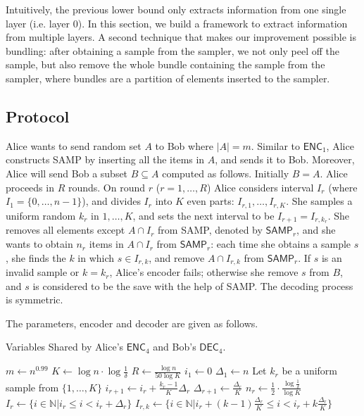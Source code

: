 \documentclass[10pt]{article}
\newcommand{\samp}{\textsf{SAMP}\xspace}
\newcommand{\enc}{\textsf{ENC}\xspace}
\newcommand{\dec}{\textsf{DEC}\xspace}
\begin{document}
Intuitively, the previous lower bound only extracts information from one single layer (i.e. layer $0$). In this section, we build a framework to extract information from multiple layers. A second technique that makes our improvement possible is bundling: after obtaining a sample from the sampler, we not only peel off the sample, but also remove the whole bundle containing the sample from the sampler, where bundles are a partition of elements inserted to the sampler.

\subsection{Protocol}

Alice wants to send random set $A$ to Bob where $|A|=m$. Similar to $\enc_1$, Alice constructs \samp by inserting all the items in $A$, and sends it to Bob. Moreover, Alice will send Bob a subset $B\subseteq A$ computed as follows. Initially $B=A$. Alice proceeds in $R$ rounds. On round $r$ ($r=1,\ldots, R$) Alice considers interval $I_r$ (where $I_1=\{0,\ldots, n-1\}$), and divides $I_r$ into $K$ even parts: $I_{r,1}, \ldots, I_{r,K}$. She samples a uniform random $k_r$ in $1,\ldots, K$, and sets the next interval to be $I_{r+1}=I_{r,k_r}$. She removes all elements except $A\cap I_r$ from \samp, denoted by $\samp_r$, and she wants to obtain $n_r$ items in $A\cap I_r$ from $\samp_r$: each time she obtains a sample $s$, she finds the $k$ in which $s \in I_{r,k}$, and remove $A\cap I_{r,k}$ from $\samp_r$. If $s$ is an invalid sample or $k=k_r$, Alice's encoder fails; otherwise she remove $s$ from $B$, and $s$ is considered to be the save with the help of \samp.  The decoding process is symmetric. 

The parameters, encoder and decoder are given as follows. 


\begin{algorithm}[H] \label{algo:para}
  \caption{Variables Shared by Alice's $\enc_4$ and Bob's $\dec_4$.}
  \begin{algorithmic}[1] 
    \State $m\leftarrow n^{0.99}$
    \State $K\leftarrow \log n \cdot \log \frac{1}{\delta}$
    \State $R\leftarrow \frac{\log n}{50 \log K}$
    \State $i_1\leftarrow 0$
    \State $\Delta_1\leftarrow n$
      \State Let $k_r$ be a uniform sample from $\{1, \ldots, K\}$
      \State $i_{r+1}\leftarrow i_r+\frac{k_r-1}{K}\Delta_r$
      \State $\Delta_{r+1}\leftarrow \frac{\Delta_r}{K}$
    \EndFor
      \State $n_r\leftarrow \frac{1}{2} \cdot \frac{\log \frac{1}{\delta}}{\log K}$
      \State $I_r \leftarrow \{i\in \mathbb{N}|i_r\le i < i_r+\Delta_r\}$
        \State $I_{r,k}\leftarrow \{i\in \mathbb{N}|i_r+(k-1)\frac{\Delta_r}{K}\le i < i_r+k\frac{\Delta_r}{K}\}$
      \EndFor
    \EndFor
  \end{algorithmic}
\end{algorithm}
\end{document}
